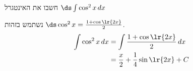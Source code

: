 חשבו את האינטגרל
$\ds \int \cos^2x \, dx$
\begin{solbox}
נשתמש בזהות $\ds \cos^2x=\frac{1+\cos\lr{2x}}{2}$.
\begin{align*}
\int \cos^2x\,dx
&=\int \frac{1+\cos\lr{2x}}{2}\,dx\\
&=\frac{x}{2}+\frac14\sin\lr{2x}+C
\end{align*}
\end{solbox}
